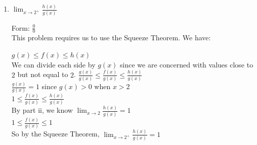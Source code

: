 \documentclass[nooutcomes]{ximera}
\begin{document}
\begin{problem}
\begin{enumerate}
\begin{enumerate}
		\item $\lim_{x \to 2^+}\frac{h(x)}{g(x)}$

		\begin{freeResponse}
		Form: $\frac{{0}}{0}$ \\
		This problem requires us to use the Squeeze Theorem.  We have: \\ 
		\begin{center}
		$g(x) \le f(x) \le h(x)$ \\

		We can divide each side by $g(x)$ since we are concerned with values close to $2$ but not equal to $2$. $\frac{g(x)}{g(x)} \le \frac{f(x)}{g(x)} \le \frac{h(x)}{g(x)}$\\
		$\frac{g(x)}{g(x)}=1$ since $g(x)>0$ when $x>2$\\
		$1 \le \frac{f(x)}{g(x)} \le \frac{h(x)}{g(x)}$\\
		By part ii, we know $\lim_{x \to 2}\frac{h(x)}{g(x)}=1$\\
		$1 \le \frac{f(x)}{g(x)} \le 1$\\
		So by the Squeeze Theorem, $\lim_{x \to 2^+}\frac{h(x)}{g(x)}=1$
			\end{center}
		\end{freeResponse}	

		\end{enumerate}
	
	\end{enumerate}

	
\end{problem}



								
				
				
	
\end{document}
